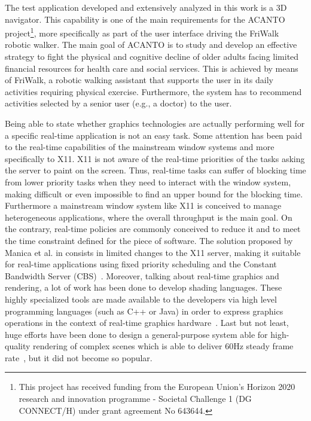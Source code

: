 The test application developed and extensively analyzed in this work is a 3D navigator.
This capability is one of the main requirements for the ACANTO~\cite{acanto}
project\footnote{This project has received funding from the European Union’s Horizon
2020 research and innovation programme - Societal Challenge 1 (DG CONNECT/H) under 
grant agreement No 643644.}, more specifically as part of the user interface driving
the FriWalk robotic walker.
The main goal of ACANTO is to study and develop an effective strategy to fight the
physical and cognitive decline of older adults facing limited financial
resources for health care and social services. This is achieved by means of FriWalk,
a robotic walking assistant that supports the user in its daily activities requiring
physical exercise. Furthermore, the system has to recommend activities selected
by a senior user (e.g., a doctor) to the user.

Being able to state whether graphics technologies are actually performing well for
a specific real-time application is not an easy task.
Some attention has been paid to the real-time capabilities of the mainstream window
systems and more specifically to X11. X11 is not aware of the real-time priorities
of the tasks asking the server to paint on the screen. Thus, real-time
tasks can suffer of blocking time from lower priority tasks when they need to
interact with the window system, making difficult or even impossible to find an
upper bound for the blocking time. Furthermore a mainstream window system like X11
is conceived to manage heterogeneous applications, where the overall throughput
is the main goal. On the contrary, real-time policies are commonly conceived to
reduce it and to meet the time constraint defined for the piece of software.
The solution proposed by Manica et al. in \cite{manica2008qos} consists in limited
changes to the X11 server, making it suitable for real-time applications using
fixed priority scheduling and the Constant Bandwidth Server
(CBS)~\cite{buttazzo2006optimal}. Moreover, talking about real-time graphics and rendering, a lot of work has been
done to develop shading languages. These highly specialized tools
are made available to the developers via high level programming languages
(such as C++ or Java) in order to express graphics operations in the context
of real-time graphics hardware~\cite{Fernando:2003:CTD:862247}. Last but not least,
huge efforts have been done to design a general-purpose system able for high-quality
rendering of complex scenes which is able to deliver 60Hz steady frame
rate~\cite{Montrym:1997:IRG:258734.258871}, but it did not become so popular.

